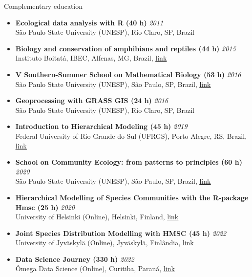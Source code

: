 \documentclass{resume}
\begin{document}
\begin{rSection}{Complementary education}

\begin{itemize} 

\item {\bf Ecological data analysis with R (40 h)} \hfill {\em 2011}\\
São Paulo State University (UNESP), Rio Claro, SP, Brazil

\item {\bf Biology and conservation of amphibians and reptiles (44 h)} \hfill {\em 2015}\\
Instituto Boitatá, IBEC, Alfenas, MG, Brazil, \href{https://www.institutoboitata.org/}{\underline{link}}

\item {\bf V Southern-Summer School on Mathematical Biology (53 h)} \hfill {\em 2016}\\
São Paulo State University (UNESP), São Paulo, SP, Brazil, \href{https://www.ictp-saifr.org/v-southern-summer-school-on-mathematical-biology}{\underline{link}} 

\item {\bf Geoprocessing with GRASS GIS (24 h)} \hfill {\em 2016}\\
São Paulo State University (UNESP), Rio Claro, SP, Brazil

\item {\bf Introduction to Hierarchical Modeling (45 h)} \hfill {\em 2019}\\
Federal University of Rio Grande do Sul (UFRGS), Porto Alegre, RS, Brazil, \href{http://ferrazlab.org/graduate}{\underline{link}}

\item {\bf School on Community Ecology: from patterns to principles (60 h)} \hfill {\em 2020}\\
São Paulo State University (UNESP), São Paulo, SP, Brazil, \href{https://www.ictp-saifr.org/community-ecology-from-patterns-to-principles}{\underline{link}}

\item {\bf Hierarchical Modelling of Species Communities with the R-package Hmsc (25 h)} \hfill {\em 2020}\\
University of Helsinki (Online), Helsinki, Finland, \href{https://www.helsinki.fi/en/researchgroups/statistical-ecology/hmsc}{\underline{link}}

\item {\bf Joint Species Distribution Modelling with HMSC (45 h)} \hfill {\em 2022}\\
University of Jyväskylä (Online), Jyväskylä, Finlândia, \href{https://www.helsinki.fi/en/researchgroups/statistical-ecology/software/hmsc}{\underline{link}}

\item {\bf Data Science Journey (330 h)} \hfill {\em 2022}\\
Ômega Data Science (Online), Curitiba, Paraná, \href{https://escola.omegadatascience.com.br}{\underline{link}}
\end{itemize} 

\end{rSection}
\end{document}
